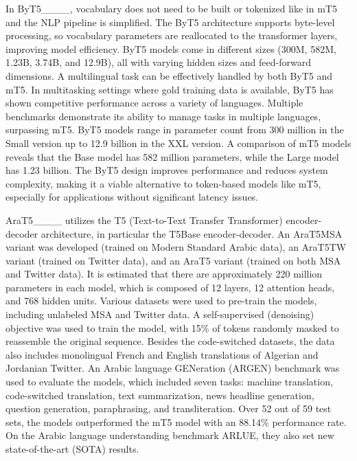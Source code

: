 In ByT5____, vocabulary does not need to be built or tokenized like in mT5 and the NLP pipeline is simplified. The ByT5 architecture supports byte-level processing, so vocabulary parameters are reallocated to the transformer layers, improving model efficiency. ByT5 models come in different sizes (300M, 582M, 1.23B, 3.74B, and 12.9B), all with varying hidden sizes and feed-forward dimensions. A multilingual task can be effectively handled by both ByT5 and mT5. In multitasking settings where gold training data is available, ByT5 has shown competitive performance across a variety of languages. Multiple benchmarks demonstrate its ability to manage tasks in multiple languages, surpassing mT5. ByT5 models range in parameter count from 300 million in the Small version up to 12.9 billion in the XXL version. A comparison of mT5 models reveals that the Base model has 582 million parameters, while the Large model has 1.23 billion. The ByT5 design improves performance and reduces system complexity, making it a viable alternative to token-based models like mT5, especially for applications without significant latency issues.

AraT5____ utilizes the T5 (Text-to-Text Transfer Transformer) encoder-decoder architecture, in particular the T5Base encoder-decoder. An AraT5MSA variant was developed (trained on Modern Standard Arabic data), an AraT5TW variant (trained on Twitter data), and an AraT5 variant (trained on both MSA and Twitter data). It is estimated that there are approximately 220 million parameters in each model, which is composed of 12 layers, 12 attention heads, and 768 hidden units. Various datasets were used to pre-train the models, including unlabeled MSA and Twitter data. A self-supervised (denoising) objective was used to train the model, with 15\% of tokens randomly masked to reassemble the original sequence. Besides the code-switched datasets, the data also includes monolingual French and English translations of Algerian and Jordanian Twitter. An Arabic language GENeration (ARGEN) benchmark was used to evaluate the models, which included seven tasks: machine translation, code-switched translation, text summarization, news headline generation, question generation, paraphrasing, and transliteration. Over 52 out of 59 test sets, the models outperformed the mT5 model with an 88.14\% performance rate. On the Arabic language understanding benchmark ARLUE, they also set new state-of-the-art (SOTA) results.